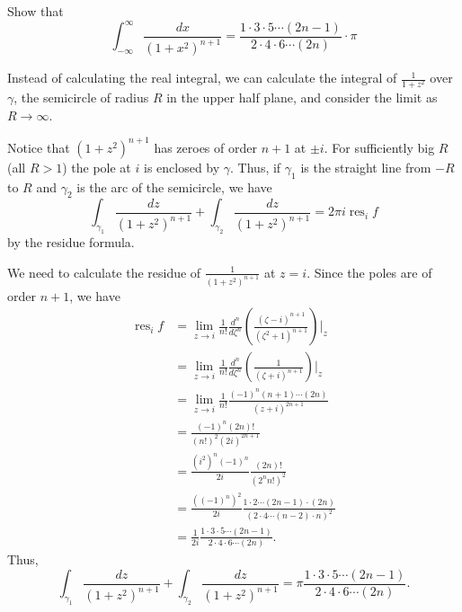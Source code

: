 \documentclass[12 pt, letterpaper]{hmcpset}
\begin{document}
\pagebreak

\begin{problem}[6]
	Show that
	\[
		\int_{-\infty}^{\infty} \frac{dx}{(1 + x^{2})^{n + 1}} = \frac{1 \cdot 3 \cdot 5 \cdots (2n - 1)}{2 \cdot 4 \cdot 6 \cdots (2n)} \cdot \pi
	\]
\end{problem}

\begin{solution}
	Instead of calculating the real integral, we can calculate the integral of $\frac{1}{1 + z^{2}}$ over $\gamma$, the semicircle of radius $R$ in the upper half plane, and consider the limit as $R \to \infty$.

	Notice that $(1 + z^{2})^{n + 1}$ has zeroes of order $n + 1$ at $\pm i$. For sufficiently big $R$ (all $R > 1$) the pole at $i$ is enclosed by $\gamma$. Thus, if $\gamma_{1}$ is the straight line from $-R$ to $R$ and $\gamma_{2}$ is the arc of the semicircle, we have
	\[
		\int_{\gamma_{1}} \frac{dz}{(1 + z^{2})^{n + 1}} + \int_{\gamma_{2}} \frac{dz}{(1 + z^{2})^{n + 1}} = 2 \pi i \operatorname{res}_{i} f
	\]
	by the residue formula.

	We need to calculate the residue of $\frac{1}{(1 + z^{2})^{n + 1}}$ at $z = i$. Since the poles are of order $n + 1$, we have
	\[
		\begin{split}
			\operatorname{res}_{i} f & = \lim_{z \to i} \frac{1}{n!} \frac{d^{n}}{d \zeta^{n}} \left ( \frac{(\zeta - i)^{n + 1}}{(\zeta^{2} + 1)^{n + 1}} \right ) \Big |_{z} \\
						 & = \lim_{z \to i} \frac{1}{n!} \frac{d^{n}}{d \zeta^{n}} \left ( \frac{1}{(\zeta + i)^{n + 1}} \right ) \Big |_{z} \\
						 & = \lim_{z \to i} \frac{1}{n!} \frac{(-1)^{n} (n + 1) \cdots (2n)}{(z + i)^{2n + 1}} \\
						 & = \frac{(-1)^{n}(2n)!}{(n!)^{2} (2i)^{2n + 1}} \\
						 & = \frac{(i^{2})^{n} (-1)^{n}}{2 i} \frac{(2n)!}{(2^{n} n!)^{2}} \\
						 & = \frac{((-1)^{n})^{2}}{2i} \frac{1 \cdot 2 \cdots (2n - 1) \cdot (2n)}{(2 \cdot 4 \cdots (n - 2) \cdot n)^{2}} \\
						 & = \frac{1}{2 i} \frac{1 \cdot 3 \cdot 5 \cdots (2n - 1)}{2 \cdot 4 \cdot 6 \cdots (2n)}.
		\end{split}
	\]
	Thus,
	\[
		\int_{\gamma_{1}} \frac{dz}{(1 + z^{2})^{n + 1}} + \int_{\gamma_{2}} \frac{dz}{(1 + z^{2})^{n + 1}} = \pi \frac{1 \cdot 3 \cdot 5 \cdots (2n - 1)}{2 \cdot 4 \cdot 6 \cdots (2n)}.
	\]


\end{solution}
\end{document}

